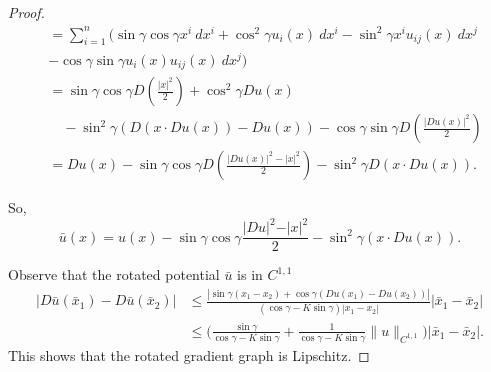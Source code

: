 \documentclass[12pt,reqno]{amsart}%
\theoremstyle{plain}
\numberwithin{equation}{section}
\theoremstyle{definition}
\theoremstyle{remark}
\begin{document}
\begin{proof}
\begin{equation*}
\begin{aligned}
     &= \sum_{i=1}^n (\sin\gamma \cos \gamma x^i \: dx^i+ \cos^2\gamma u_i(x)\: dx^i-\sin^2\gamma x^iu_{ij}(x)\: dx^j\\
     &-\cos\gamma \sin\gamma u_i(x)u_{ij}(x)\: dx^j)\\
     &= \sin\gamma \cos \gamma D\left (\frac{|x|^2}{2}\right )+\cos^2 \gamma Du(x)\\
     & \quad -\sin^2\gamma(D(x\cdot Du(x))-Du(x))-\cos\gamma\sin\gamma D\left (\frac{|Du(x)|^2}{2}\right)\\
     &=Du(x)-\sin\gamma\cos\gamma D\left (\frac{|Du(x)|^2-|x|^2}{2}\right )-\sin^2\gamma D(x\cdot Du(x)).
\end{aligned} 
\end{equation*}

So,
\[
\bar u (x)=u(x)-\sin\gamma\cos\gamma\frac{\vert Du\vert ^2-\vert x\vert^2}{2}-\sin^2\gamma (x\cdot Du(x)).
\]



Observe that the rotated potential $\bar u$ is in $C^{1,1} $ 
\begin{equation*}
    \begin{aligned}
        |D\bar u(\bar x_1)-D\bar u(\bar x_2)|  
        & \leq  \frac{ | \sin \gamma  ( x_1 - x_2 ) + \cos \gamma ( D u ( x_1) - D u ( x_2 ) ) | } { ( \cos \gamma  - K \sin \gamma ) |x_1 - x_2  |}|\bar x_1-\bar x_2|\\
        &\leq \bigg(   \frac{\sin \gamma }{ \cos \gamma - K \sin \gamma } + \frac{ 1}{ \cos \gamma - K \sin \gamma } \| u \| _{ C^{1,1} }\bigg) |\bar x_1-\bar x_2|.
    \end{aligned}
\end{equation*}
This shows that the rotated gradient graph is Lipschitz.
\end{proof} 
\end{document}
